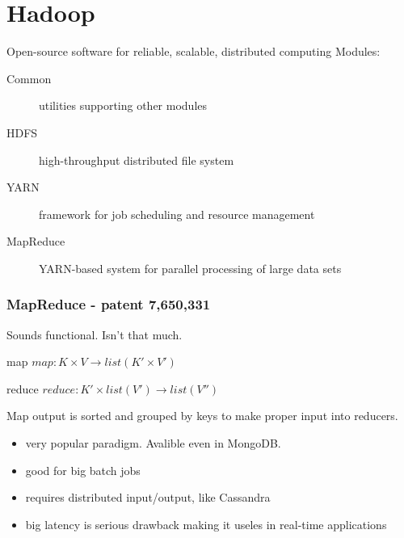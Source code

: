 \documentclass{beamer}
\begin{document}
\section{Hadoop}

\begin{frame}
    \begin{block}{Open-source software for reliable, scalable, distributed computing}
        Modules:
        \begin{description}
            \item[Common] utilities supporting other modules
            \item[HDFS] high-throughput distributed file system
            \item[YARN] framework for job scheduling and resource management
            \item[MapReduce] YARN-based system for parallel processing of large data sets
        \end{description}
    \end{block}
\end{frame}



\begin{frame}
    \frametitle{MapReduce - patent 7,650,331}
    Sounds functional. \pause Isn't that much.
    \begin{block}{map}
        $ map: K \times V \rightarrow list (K' \times V') $
    \end{block}
    \begin{block}{reduce}
        $ reduce: K' \times list(V') \rightarrow list (V'')$
    \end{block}

    Map output is sorted and grouped by keys to make proper input into reducers.

    \begin{itemize}
        \item very popular paradigm. Avalible even in MongoDB.
        \item good for big batch jobs
        \item requires distributed input/output, like Cassandra
        \item big latency is serious drawback making it useles in real-time applications
    \end{itemize}

\end{frame}
\end{document}
